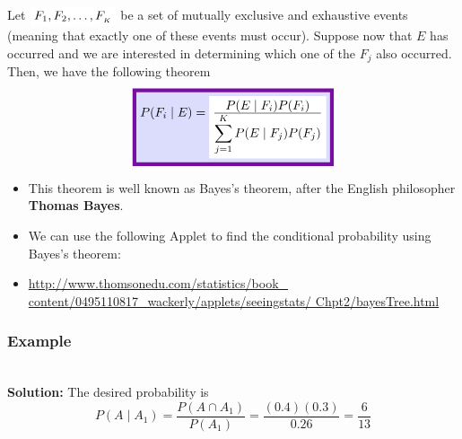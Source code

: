 \documentclass[compress]{beamer}
\begin{document}
\begin{frame}

\begin{theorem}
Let $\HLTW{F_1, F_2, \ldots,  F_{_K}}$ be a set of mutually exclusive and
exhaustive events (meaning that exactly one of these events
must occur). Suppose now that $E$ has occurred and we are
interested in determining which one of the $F_j$ also occurred.
Then, we have the following theorem
$$\DBX{ \displaystyle P(F_i \mid E)=\HLTW{ \frac{ \displaystyle P(E\mid F_i) P(F_i )}{\displaystyle \sum_{j=1}^{K}P(E\mid F_j) P(F_j) }}}$$
\end{theorem}



\end{frame}


\begin{frame}
\begin{itemize}
\item This theorem is well known as Bayes's theorem, after the
English philosopher {\bf Thomas Bayes}.
\vspace{.25in}


\item We can use the following Applet to find the conditional
probability using Bayes's theorem:
\vspace{.25in}




\item \url{http://www.thomsonedu.com/statistics/book_
content/0495110817_wackerly/applets/seeingstats/
Chpt2/bayesTree.html}
\end{itemize}



\end{frame}






\begin{frame}\frametitle{Example}
\vspace{-.1in}
\\
\pause
\vspace{.6in}
{\tiny {\bf Solution:}  
 The desired probability is 
 $$P(A\mid A_1)=  \frac{P(A\cap A_1)}{P(A_1)}= \frac{(0.4)(0.3)}{0.26}= \frac{6}{13} $$
}
\end{frame}
\end{document}
